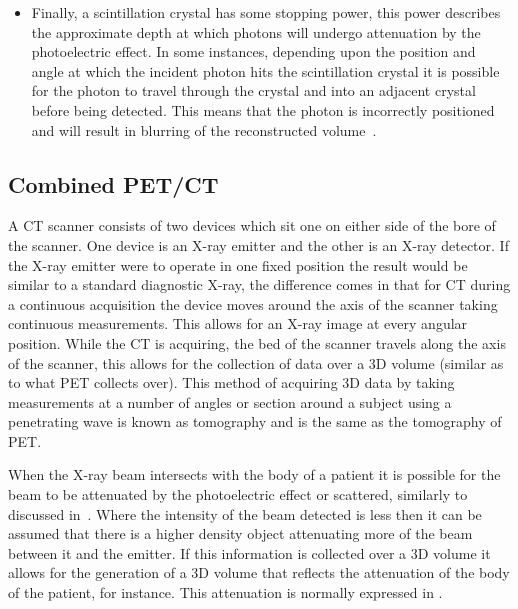 \begin{itemize}
                    \item Finally, %
                    a scintillation crystal has some stopping power, this power describes the approximate depth at which photons will undergo attenuation by the photoelectric effect. In some instances, depending upon the position and angle at which the incident photon hits the scintillation crystal it is possible for the photon to travel through the crystal and into an adjacent crystal before being detected. This means that the photon is incorrectly positioned and will result in blurring of the reconstructed volume~.
                \end{itemize}
        
        \subsection{Combined PET/CT} \label{sec:combined_pet_ct}
            A \gls{CT} scanner consists of two devices which sit one on either side of the bore of the scanner. %
            One device is an X-ray emitter and the other is an X-ray detector. If the X-ray emitter were to operate in one fixed position the result would be similar to a standard diagnostic X-ray, the difference comes in that for \gls{CT} during a continuous acquisition the device moves around the axis of the scanner taking continuous measurements. This allows for an X-ray image at every angular position. While the \gls{CT} is acquiring, the bed of the scanner travels along the axis of the scanner, %
            this allows for the collection of data over a \gls{3D} volume (similar as to what \gls{PET} collects over). This method of acquiring \gls{3D} data by taking measurements at a number of angles or section around a subject using a penetrating wave is known as tomography and is the same as the tomography of \gls{PET}.
            
            When the X-ray beam intersects with the body of a patient it is possible for the beam to be attenuated by the photoelectric effect or scattered,%
            similarly to discussed in~. Where the intensity of the beam detected is less then it can be assumed that there is a higher density object attenuating more of the beam between it and the emitter. If this information is collected over a \gls{3D} volume it allows for the generation of a \gls{3D} volume that reflects the attenuation of the body of the patient, for instance. This attenuation is normally expressed in .
            

